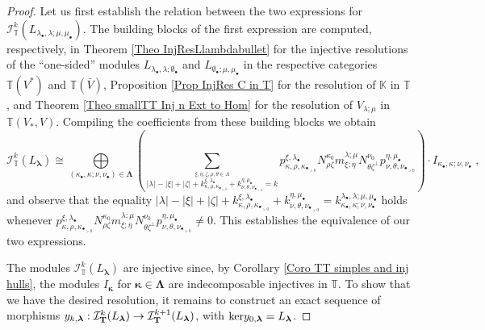 \documentclass[12pt]{article}
\def\KK {{\mathbb K}}     %
\def\TT {{\mathbb T}}     %
\def\mc {\mathcal}
\begin{document}
\begin{proof}
Let us first establish the relation between the two expressions for $\mc I_{\TT}^{k}(L_{\lambda_\bullet,\lambda;\mu,\mu_\bullet})$. The building blocks of the first expression are computed, respectively, in Theorem \ref{Theo InjResLlambdabullet} for the injective resolutions of the ``one-sided'' modules $L_{\lambda_\bullet,\lambda;\emptyset_\bullet}$ and $L_{\emptyset_\bullet;\mu,\mu_\bullet}$ in the respective categories $\TT(V^*)$ and $\TT(\bar V)$, Proposition \ref{Prop InjRes C in T} for the resolution of $\KK$ in $\TT$, and Theorem \ref{Theo smallTT Inj n Ext to Hom} for the resolution of $V_{\lambda;\mu}$ in $\TT(V_*,V)$. Compiling the coefficients from these building blocks we obtain
$$
\mc I_{\TT}^{k}(L_{\bm\lambda})\cong \bigoplus\limits_{(\kappa_\bullet,\kappa;\nu,\nu_\bullet)\in\bm\Lambda} \left(\sum\limits_{\stackrel{\xi,\eta,\zeta,\rho,\theta\in\Lambda}{|\lambda|-|\xi|+|\zeta|+k^{\xi,\lambda_{\bullet}}_{\kappa,\rho,\kappa_{\bullet_{>0}}}+k^{\eta,\mu_\bullet}_{\nu,\theta,\nu_{\bullet_{>0}}} = k}}  p^{\xi,\lambda_{\bullet}}_{\kappa,\rho,\kappa_{\bullet_{>0}}} N^{\kappa_0}_{\rho\zeta} m^{\lambda;\mu}_{\xi;\eta} N^{\nu_0}_{\theta\zeta^\perp} p^{\eta,\mu_\bullet}_{\nu,\theta,\nu_{\bullet_{>0}}} \right) \cdot I_{\kappa_\bullet,\kappa;\nu,\nu_\bullet} \;,
$$
and observe that the equality $|\lambda|-|\xi|+|\zeta|+k^{\xi,\lambda_{\bullet}}_{\kappa,\rho,\kappa_{\bullet_{>0}}}+k^{\eta,\mu_\bullet}_{\nu,\theta,\nu_{\bullet_{>0}}}=k^{\lambda_\bullet,\lambda;\mu,\mu_\bullet}_{\kappa_\bullet,\kappa;\nu,\nu_\bullet}$ holds whenever $p^{\xi,\lambda_{\bullet}}_{\kappa,\rho,\kappa_{\bullet_{>0}}} N^{\kappa_0}_{\rho\zeta} m^{\lambda;\mu}_{\xi;\eta} N^{\nu_0}_{\theta\zeta^\perp} p^{\eta,\mu_\bullet}_{\nu,\theta,\nu_{\bullet_{>0}}}\ne 0$. This establishes the equivalence of our two expressions.

The modules $\mc I_{\TT}^{k}(L_{\bm\lambda})$ are injective since, by Corollary \ref{Coro TT simples and inj hulls}, the modules $I_{\bm \kappa}$ for $\bm\kappa\in\bm\Lambda$ are indecomposable injectives in $\TT$. To show that we have the desired resolution, it remains to construct an exact sequence of morphisms $y_{k,\bm\lambda}:\mc I_{\bf T}^k(L_{\bm \lambda})\to \mc I_{\bf T}^{k+1}(L_{\bm \lambda})$, with ${\rm ker}y_{0,\bm\lambda}=L_{\bm\lambda}$.


\end{proof}
\end{document}
